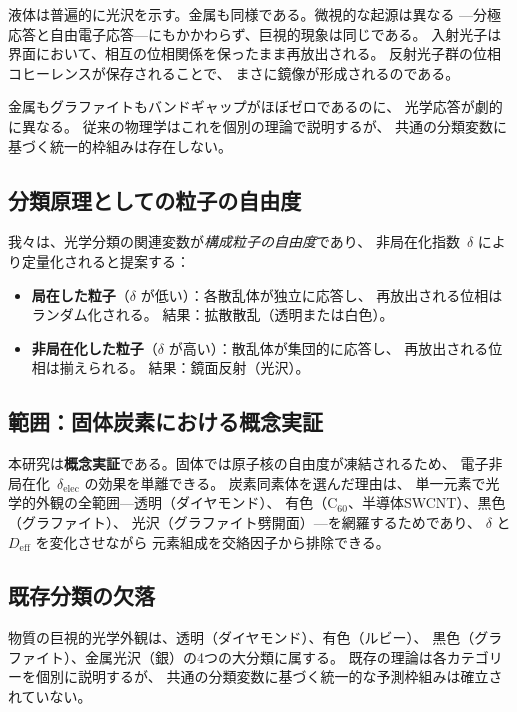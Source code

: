 \documentclass[twocolumn,showpacs,preprintnumbers,amsmath,amssymb,prb]{revtex4-2}
\begin{document}
液体は普遍的に光沢を示す。金属も同様である。微視的な起源は異なる
---分極応答と自由電子応答---にもかかわらず、巨視的現象は同じである。
入射光子は界面において、相互の位相関係を保ったまま再放出される。
反射光子群の位相コヒーレンスが保存されることで、
まさに鏡像が形成されるのである。

金属もグラファイトもバンドギャップがほぼゼロであるのに、
光学応答が劇的に異なる。
従来の物理学はこれを個別の理論で説明するが、
共通の分類変数に基づく統一的枠組みは存在しない。

\subsection{分類原理としての粒子の自由度}

我々は、光学分類の関連変数が\emph{構成粒子の自由度}であり、
非局在化指数~$\delta$ により定量化されると提案する：

\begin{itemize}
  \item \textbf{局在した粒子}（$\delta$ が低い）：各散乱体が独立に応答し、
    再放出される位相はランダム化される。
    結果：拡散散乱（透明または白色）。
  \item \textbf{非局在化した粒子}（$\delta$ が高い）：散乱体が集団的に応答し、
    再放出される位相は揃えられる。
    結果：鏡面反射（光沢）。
\end{itemize}

\subsection{範囲：固体炭素における概念実証}

本研究は\textbf{概念実証}である。固体では原子核の自由度が凍結されるため、
電子非局在化~$\delta_\mathrm{elec}$ の効果を単離できる。
炭素同素体を選んだ理由は、
単一元素で光学的外観の全範囲---透明（ダイヤモンド）、
有色（C$_{60}$、半導体SWCNT）、黒色（グラファイト）、
光沢（グラファイト劈開面）---を網羅するためであり、
$\delta$ と $D_\mathrm{eff}$ を変化させながら
元素組成を交絡因子から排除できる。

\subsection{既存分類の欠落}

物質の巨視的光学外観は、透明（ダイヤモンド）、有色（ルビー）、
黒色（グラファイト）、金属光沢（銀）の4つの大分類に属する。
既存の理論は各カテゴリーを個別に説明するが、
共通の分類変数に基づく統一的な予測枠組みは確立されていない。
\end{document}
